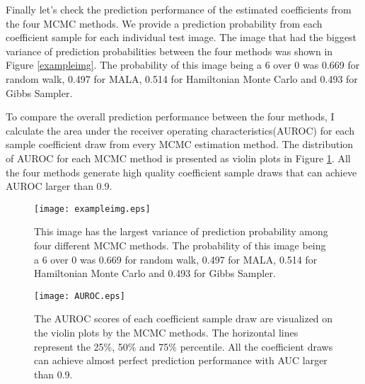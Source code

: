 \documentclass[12pt]{article}
\begin{document}
Finally let's check the prediction performance of the estimated coefficients from the four MCMC methods. We provide a prediction probability from each coefficient sample for each individual test image. The image that had the biggest variance of prediction probabilities between the four methods was shown in Figure \ref{exampleimg}. The probability of this image being a 6 over 0 was 0.669 for random walk, 0.497 for MALA, 0.514 for Hamiltonian Monte Carlo and 0.493 for Gibbs Sampler.

To compare the overall prediction performance between the four methods, I calculate the area under the receiver operating characteristics(AUROC) for each sample coefficient draw from every MCMC estimation method. The distribution of AUROC for each MCMC method is presented as violin plots in Figure \ref{auroc}. All the four methods generate high quality coefficient sample draws that can achieve AUROC larger than 0.9.

\begin{figure}[htbp]
	\centering
	\texttt{[image: exampleimg.eps]}
	\caption{This image has the largest variance of prediction probability among four different MCMC methods. The probability of this image being a 6 over 0 was 0.669 for random walk, 0.497 for MALA, 0.514 for Hamiltonian Monte Carlo and 0.493 for Gibbs Sampler.}\label{exampleimg}
	\texttt{[image: AUROC.eps]}
	\caption{The AUROC scores of each coefficient sample draw are visualized on the violin plots by the MCMC methods. The horizontal lines represent the 25\%, 50\% and 75\% percentile. All the coefficient draws can achieve almost perfect prediction performance with AUC larger than 0.9.}\label{auroc}
\end{figure}






\end{document}
